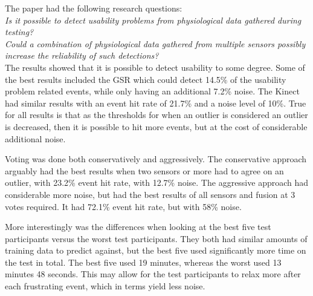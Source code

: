 The paper had the following research questions:\\

\textit{Is it possible to detect usability problems from physiological data gathered during testing?}\\

\textit{Could a combination of physiological data gathered from multiple sensors possibly increase the reliability of such detections?}\\

The results showed that it is possible to detect usability to some degree. 
Some of the best results included the GSR which could detect 14.5\% of the usability problem related events, while only having an additional 7.2\% noise. 
The Kinect had similar results with an event hit rate of 21.7\% and a noise level of 10\%. 
True for all results is that as the thresholds for when an outlier is considered an outlier is decreased, then it is possible to hit more events, but at the cost of considerable additional noise.

Voting was done both conservatively and aggressively.
The conservative approach arguably had the best results when two sensors or more had to agree on an outlier, with 23.2\% event hit rate, with 12.7\% noise.
The aggressive approach had considerable more noise, but had the best results of all sensors and fusion at 3 votes required.
It had 72.1\% event hit rate, but with 58\% noise.

More interestingly was the differences when looking at the best five test participants versus the worst test participants. 
They both had similar amounts of training data to predict against, but the best five used significantly more time on the test in total.
The best five used 19 minutes, whereas the worst used 13 minutes 48 seconds. 
This may allow for the test participants to relax more after each frustrating event, which in terms yield less noise. 
